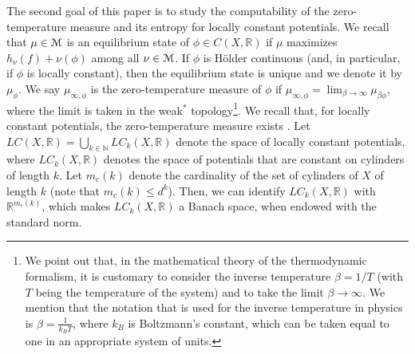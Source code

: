 \documentclass[11pt, reqno]{amsart}
\newcommand{\cM}{\EuScript{M}}
\newcommand{\bR}{{\mathbb R}}
\newcommand{\bN}{{\mathbb N}}
\begin{document}
The second goal of this paper is to study the computability of the zero-temperature measure and its entropy for locally constant potentials.
We recall that $\mu\in \cM$ is an equilibrium state of $\phi\in C(X,\bR)$ if $\mu$ maximizes $h_\nu(f)+\nu(\phi)$ among all $\nu\in \cM$. If $\phi$ is H\"older continuous  (and, in particular, if $\phi$ is locally constant), then the equilibrium state is unique and we denote it by $\mu_\phi$. We say $\mu_{\infty,\phi}$ is the  zero-temperature measure of $\phi$ if $\mu_{\infty,\phi}=\lim_{\beta\to\infty}\mu_{\beta\phi}$, where the limit is taken in the weak$^\ast$ topology\footnote{We point out that, in the mathematical theory of the thermodynamic formalism,
it is customary to consider the inverse temperature $\beta=1/T$ (with $T$ being the temperature of the system) and to take the limit $\beta\to\infty$. We mention that the notation that is used for the inverse temperature in physics is $\beta=\frac{1}{k_BT}$, where $k_{B}$ is Boltzmann's constant, which can be taken equal to one in an appropriate system of units.}. We recall that, for locally constant potentials, the zero-temperature measure exists \cite{Br}.  Let  $LC(X,\bR)=\bigcup_{k\in \bN} LC_k(X,\bR)$ denote the space of locally constant potentials, where $LC_k(X,\mathbb{R})$ denotes the space of potentials that are constant on cylinders of length $k$.  Let $m_c(k)$ denote the cardinality of the set of  cylinders of $X$ of length $k$ (note that $m_c(k)\leq d^k$).  Then, we can identify $LC_k(X,\mathbb{R})$ with $\mathbb{R}^{m_c(k)}$, which makes $LC_k(X,\mathbb{R})$  a Banach space, when endowed with the standard norm.
\end{document}
